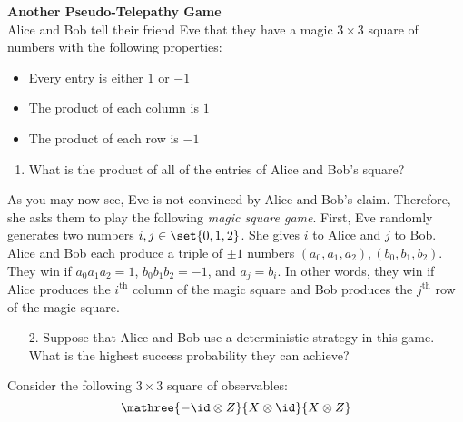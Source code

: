 \begin{exercises}
\item {\bf Another Pseudo-Telepathy Game}\\
Alice and Bob tell their friend Eve that they have a magic $3\times 3$ square of numbers with the following properties:
\begin{itemize}
    \item Every entry is either $1$ or $-1$
    \item The product of each column is $1$
    \item The product of each row is $-1$
\end{itemize}
\begin{enumerate}
\item What is the product of all of the entries of Alice and Bob's square?
\end{enumerate}
As you may now see, Eve is not convinced by Alice and Bob's claim. Therefore, she asks them to play the following \emph{magic square game}. First, Eve randomly generates two numbers $i,j\in \set{0,1,2}$. She gives $i$ to Alice and $j$ to Bob. Alice and Bob each produce a triple of $\pm 1$ numbers $(a_0,a_1,a_2), (b_0,b_1,b_2)$. They win if $a_0a_1a_2 = 1$, $b_0b_1b_2 = -1$, and $a_j = b_i$. In other words, they win if Alice produces the $i^{\text{th}}$ column of the magic square and Bob produces the $j^{\text{th}}$ row of the magic square.
\begin{enumerate}
\item[2.] Suppose that Alice and Bob use a deterministic strategy in this game. What is the highest success probability they can achieve?
\end{enumerate}
Consider the following $3\times 3$ square of observables:
\begin{equation*}
	\mathree
    {-\id\otimes Z} {X\otimes \id} {X\otimes Z}

\end{equation*}
\end{exercises}
